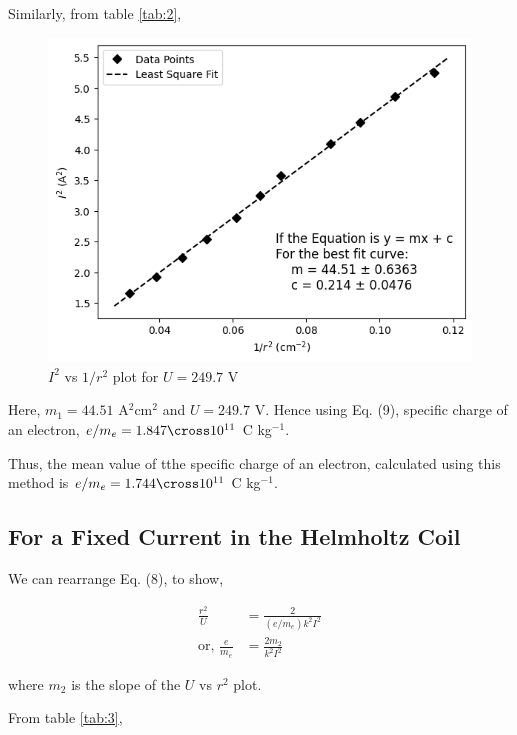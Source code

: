     Similarly, from table \ref{tab:2}, 

    \begin{figure}[H]
        \centering
        \includegraphics[height=0.7\columnwidth]{images/g2.png}
        \caption{$I^2$ vs $1/r^2$ plot for $U=249.7$ V}
        \label{graph:2}
    \end{figure}

    Here, $m_1=44.51$ A$^2$cm$^2$ and $U=249.7$ V. Hence using Eq. (9), specific charge of an electron, $e/m_e=1.847\cross10^{11}$ C kg$^{-1}$.

    Thus, the mean value of tthe specific charge of an electron, calculated using this method is $e/m_e=1.744\cross10^{11}$ C kg$^{-1}$.

\subsection{For a Fixed Current in the Helmholtz Coil}
    We can rearrange Eq. (8), to show,

    \begin{align}
        \frac{r^2}{U} &= \frac{2}{(e/m_e)k^2I^2} \nonumber\\
        \text{or, }\frac{e}{m_e} &= \frac{2m_2}{k^2I^2}
    \end{align}

    where $m_2$ is the slope of the $U$ vs $r^2$ plot.

    From table \ref{tab:3}, 

